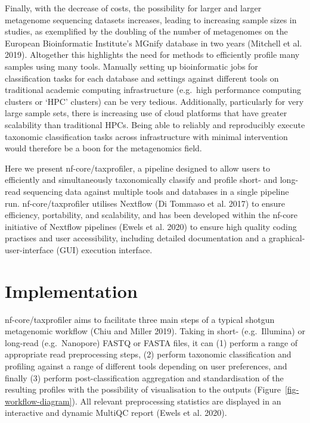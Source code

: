 \documentclass[
]{article}
\begin{document}
Finally, with the decrease of costs, the possibility for larger and
larger metagenome sequencing datasets increases, leading to increasing
sample sizes in studies, as exemplified by the doubling of the number of
metagenomes on the European Bioinformatic Institute's MGnify database in
two years (Mitchell et al. 2019). Altogether this highlights the need
for methods to efficiently profile many samples using many tools.
Manually setting up bioinformatic jobs for classification tasks for each
database and settings against different tools on traditional academic
computing infrastructure (e.g.~high performance computing clusters or
`HPC' clusters) can be very tedious. Additionally, particularly for very
large sample sets, there is increasing use of cloud platforms that have
greater scalability than traditional HPCs. Being able to reliably and
reproducibly execute taxonomic classification tasks across
infrastructure with minimal intervention would therefore be a boon for
the metagenomics field.

Here we present nf-core/taxprofiler, a pipeline designed to allow users
to efficiently and simultaneously taxonomically classify and profile
short- and long-read sequencing data against multiple tools and
databases in a single pipeline run. nf-core/taxprofiler utilises
Nextflow (Di Tommaso et al. 2017) to ensure efficiency, portability, and
scalability, and has been developed within the nf-core initiative of
Nextflow pipelines (Ewels et al. 2020) to ensure high quality coding
practises and user accessibility, including detailed documentation and a
graphical-user-interface (GUI) execution interface.

\hypertarget{implementation}{%
\section{Implementation}\label{implementation}}

nf-core/taxprofiler aims to facilitate three main steps of a typical
shotgun metagenomic workflow (Chiu and Miller 2019). Taking in short-
(e.g.~Illumina) or long-read (e.g.~Nanopore) FASTQ or FASTA files, it
can (1) perform a range of appropriate read preprocessing steps, (2)
perform taxonomic classification and profiling against a range of
different tools depending on user preferences, and finally (3) perform
post-classification aggregation and standardisation of the resulting
profiles with the possibility of visualisation to the outputs
(Figure~\ref{fig-workflow-diagram}). All relevant preprocessing
statistics are displayed in an interactive and dynamic MultiQC report
(Ewels et al. 2020).
\end{document}
